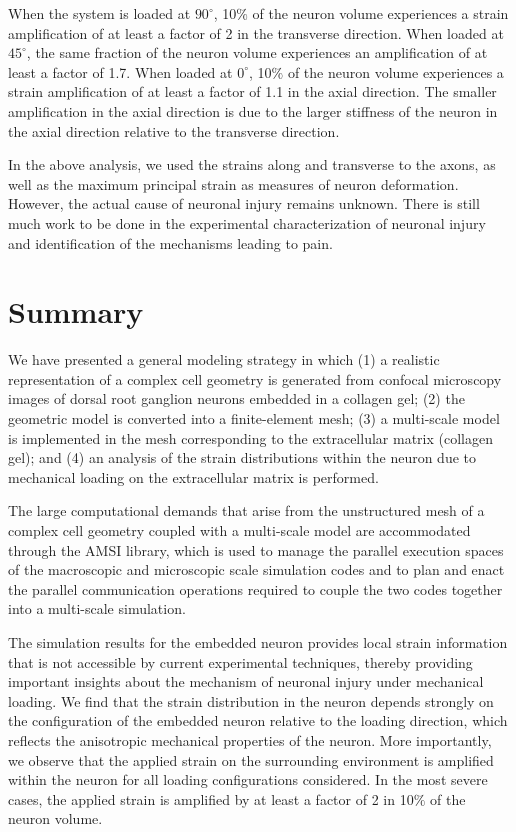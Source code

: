 \documentclass[]{interact}
\begin{document}
When the system is loaded at $90^{\circ}$, 10$\%$ of the neuron volume experiences a strain amplification of at least a factor of 2 in the transverse direction. When loaded at $45^{\circ}$, the same fraction of the neuron volume experiences an amplification of at least a factor of 1.7. When loaded at $0^{\circ}$, 10$\%$ of the neuron volume experiences a strain amplification of at least a factor of 1.1 in the axial direction. The smaller amplification in the axial direction is due to the larger stiffness of the neuron in the axial direction relative to the transverse direction. 

In the above analysis, we used the strains along and transverse to the axons, as well as the maximum principal strain as measures of neuron deformation. However, the actual cause of neuronal injury remains unknown. There is still much work to be done in the experimental characterization of neuronal injury and identification of the mechanisms leading to pain.
\section{Summary}
\label{sec:summary}

We have presented a general modeling strategy in which (1) a realistic representation of a complex cell geometry is generated from confocal microscopy images of dorsal root ganglion neurons embedded in a collagen gel; (2) the geometric model is converted into a finite-element mesh; (3) a multi-scale model is implemented in the mesh corresponding to the extracellular matrix (collagen gel); and (4) an analysis of the strain distributions within the neuron due to mechanical loading on the extracellular matrix is performed.

The large computational demands that arise from the unstructured mesh of a complex cell geometry coupled with a multi-scale model are accommodated through the AMSI library, which is used to manage the parallel execution spaces of the macroscopic and microscopic scale simulation codes and to plan and enact the parallel communication operations required to couple the two codes together into a multi-scale simulation. 

The simulation results for the embedded neuron provides local strain information that is not accessible by current experimental techniques, thereby providing important insights about the mechanism of neuronal injury under mechanical loading. We find that the strain distribution in the neuron depends strongly on the configuration of the embedded neuron relative to the loading direction, which reflects the anisotropic mechanical properties of the neuron. More importantly, we observe that the applied strain on the surrounding environment is amplified within the neuron for all loading configurations considered. In the most severe cases, the applied strain is amplified by at least a factor of 2 in 10$\%$ of the neuron volume. 
\end{document}

